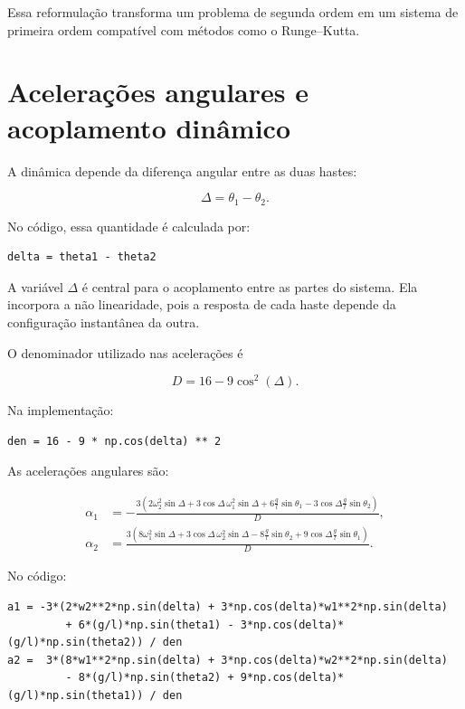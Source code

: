 \documentclass[12pt,a4paper]{article}
\begin{document}
Essa reformulação transforma um problema de segunda ordem em um sistema de primeira ordem compatível com métodos como o Runge--Kutta.

\section{Acelerações angulares e acoplamento dinâmico}

A dinâmica depende da diferença angular entre as duas hastes:

\begin{equation}
\Delta = \theta_1 - \theta_2.
\end{equation}

No código, essa quantidade é calculada por:

\begin{lstlisting}
delta = theta1 - theta2
\end{lstlisting}

A variável $\Delta$ é central para o acoplamento entre as partes do sistema. Ela incorpora a não linearidade, pois a resposta de cada haste depende da configuração instantânea da outra.

O denominador utilizado nas acelerações é

\begin{equation}
D = 16 - 9\cos^2(\Delta).
\end{equation}

Na implementação:

\begin{lstlisting}
den = 16 - 9 * np.cos(delta) ** 2
\end{lstlisting}

As acelerações angulares são:

\begin{align}
\alpha_1 &= -\frac{3\left(2\omega_2^2\sin\Delta
+3\cos\Delta\,\omega_1^2\sin\Delta
+6\frac{g}{l}\sin\theta_1
-3\cos\Delta\frac{g}{l}\sin\theta_2\right)}{D},\\
\alpha_2 &= \frac{3\left(8\omega_1^2\sin\Delta
+3\cos\Delta\,\omega_2^2\sin\Delta
-8\frac{g}{l}\sin\theta_2
+9\cos\Delta\frac{g}{l}\sin\theta_1\right)}{D}.
\end{align}

No código:

\begin{lstlisting}
a1 = -3*(2*w2**2*np.sin(delta) + 3*np.cos(delta)*w1**2*np.sin(delta)
         + 6*(g/l)*np.sin(theta1) - 3*np.cos(delta)*(g/l)*np.sin(theta2)) / den
a2 =  3*(8*w1**2*np.sin(delta) + 3*np.cos(delta)*w2**2*np.sin(delta)
         - 8*(g/l)*np.sin(theta2) + 9*np.cos(delta)*(g/l)*np.sin(theta1)) / den
\end{lstlisting}
\end{document}
